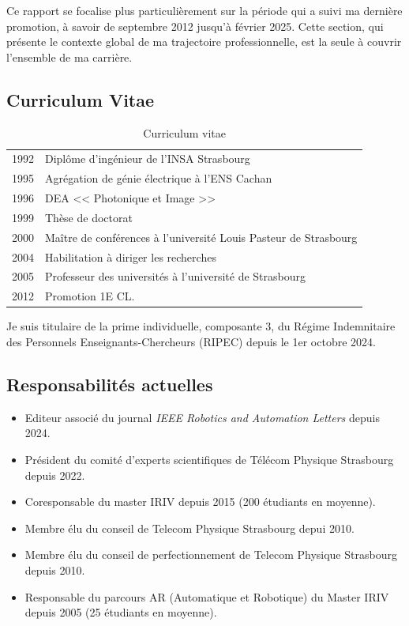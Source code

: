 \documentclass[a4paper,12pt]{article}
\begin{document}
Ce rapport se focalise plus particulièrement sur la période qui a suivi ma dernière promotion, à savoir de septembre 2012 jusqu'à février 2025. Cette section, qui présente le contexte global de ma trajectoire professionnelle, est la seule à couvrir l'ensemble de ma carrière.

\subsection{Curriculum Vitae}

\begin{table}[H]
    \centering
    \begin{tabular}{ll}
    \toprule
        1992	& Diplôme d'ingénieur de l'INSA Strasbourg\\
        1995	& Agrégation de génie électrique à l'ENS Cachan\\
        1996	& DEA << Photonique et Image >>\\
        1999	& Thèse de doctorat\\
        2000	& Maître de conférences à l’université Louis Pasteur de Strasbourg\\
        2004	& Habilitation à diriger les recherches\\
        2005	& Professeur des universités à l’université de Strasbourg\\
        2012    & Promotion 1E CL.\\
    \bottomrule
    \end{tabular}
    \caption{Curriculum vitae}
    \label{tab:CV}
\end{table}

Je suis titulaire de la prime individuelle, composante 3, du Régime Indemnitaire des
Personnels Enseignants-Chercheurs (RIPEC) depuis le 1er octobre 2024.

\subsection{Responsabilités actuelles}

\begin{itemize}
    \item Editeur associé du journal \textit{IEEE Robotics and Automation Letters} depuis 2024.
    \item Président du comité d’experts scientifiques de Télécom Physique Strasbourg depuis 2022.
    \item Coresponsable du master IRIV depuis 2015 (200 étudiants en moyenne).
    \item Membre élu du conseil de Telecom Physique Strasbourg depui 2010.
    \item Membre élu du conseil de perfectionnement de Telecom Physique Strasbourg depuis 2010.
    \item Responsable du parcours AR (Automatique et Robotique) du Master IRIV depuis 2005 (25 étudiants en moyenne).
\end{itemize}
\end{document}
